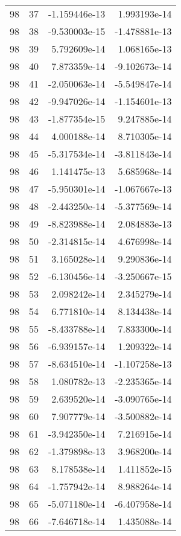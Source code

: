 \begin{tabular}{rrrr}
  98 &   37 & -1.159446e-13 &  1.993193e-14 \\
  98 &   38 & -9.530003e-15 & -1.478881e-13 \\
  98 &   39 &  5.792609e-14 &  1.068165e-13 \\
  98 &   40 &  7.873359e-14 & -9.102673e-14 \\
  98 &   41 & -2.050063e-14 & -5.549847e-14 \\
  98 &   42 & -9.947026e-14 & -1.154601e-13 \\
  98 &   43 & -1.877354e-15 &  9.247885e-14 \\
  98 &   44 &  4.000188e-14 &  8.710305e-14 \\
  98 &   45 & -5.317534e-14 & -3.811843e-14 \\
  98 &   46 &  1.141475e-13 &  5.685968e-14 \\
  98 &   47 & -5.950301e-14 & -1.067667e-13 \\
  98 &   48 & -2.443250e-14 & -5.377569e-14 \\
  98 &   49 & -8.823988e-14 &  2.084883e-13 \\
  98 &   50 & -2.314815e-14 &  4.676998e-14 \\
  98 &   51 &  3.165028e-14 &  9.290836e-14 \\
  98 &   52 & -6.130456e-14 & -3.250667e-15 \\
  98 &   53 &  2.098242e-14 &  2.345279e-14 \\
  98 &   54 &  6.771810e-14 &  8.134438e-14 \\
  98 &   55 & -8.433788e-14 &  7.833300e-14 \\
  98 &   56 & -6.939157e-14 &  1.209322e-14 \\
  98 &   57 & -8.634510e-14 & -1.107258e-13 \\
  98 &   58 &  1.080782e-13 & -2.235365e-14 \\
  98 &   59 &  2.639520e-14 & -3.090765e-14 \\
  98 &   60 &  7.907779e-14 & -3.500882e-14 \\
  98 &   61 & -3.942350e-14 &  7.216915e-14 \\
  98 &   62 & -1.379898e-13 &  3.968200e-14 \\
  98 &   63 &  8.178538e-14 &  1.411852e-15 \\
  98 &   64 & -1.757942e-14 &  8.988264e-14 \\
  98 &   65 & -5.071180e-14 & -6.407958e-14 \\
  98 &   66 & -7.646718e-14 &  1.435088e-14 \\

\end{tabular}

